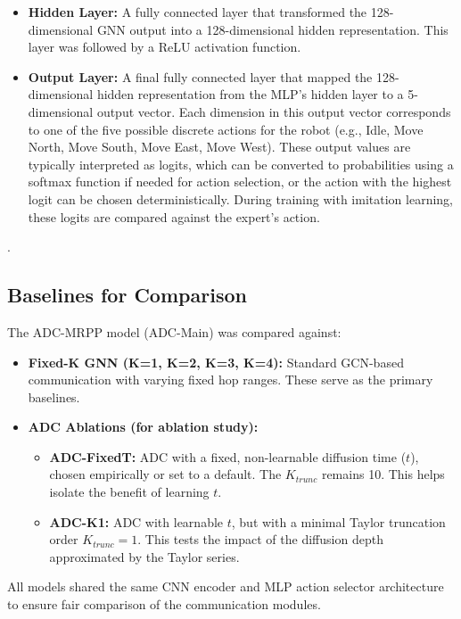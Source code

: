 \begin{itemize}
\begin{itemize}
            \item \textbf{Hidden Layer:} A fully connected layer that transformed the 128-dimensional GNN output into a 128-dimensional hidden representation. This layer was followed by a ReLU activation function.
            \item \textbf{Output Layer:} A final fully connected layer that mapped the 128-dimensional hidden representation from the MLP's hidden layer to a 5-dimensional output vector. Each dimension in this output vector corresponds to one of the five possible discrete actions for the robot (e.g., Idle, Move North, Move South, Move East, Move West). These output values are typically interpreted as logits, which can be converted to probabilities using a softmax function if needed for action selection, or the action with the highest logit can be chosen deterministically. During training with imitation learning, these logits are compared against the expert's action.
        \end{itemize}.
\end{itemize}


\subsection{Baselines for Comparison}
\label{subsec:baselines}
The ADC-MRPP model (ADC-Main) was compared against:
\begin{itemize}
    \item \textbf{Fixed-K GNN (K=1, K=2, K=3, K=4):} Standard GCN-based communication with varying fixed hop ranges. These serve as the primary baselines.
    \item \textbf{ADC Ablations (for ablation study):}
        \begin{itemize}
            \item \textbf{ADC-FixedT:} ADC with a fixed, non-learnable diffusion time ($t$), chosen empirically or set to a default. The $K_{trunc}$ remains 10. This helps isolate the benefit of learning $t$.
            \item \textbf{ADC-K1:} ADC with learnable $t$, but with a minimal Taylor truncation order $K_{trunc}=1$. This tests the impact of the diffusion depth approximated by the Taylor series.
        \end{itemize}
\end{itemize}
All models shared the same CNN encoder and MLP action selector architecture to ensure fair comparison of the communication modules.

